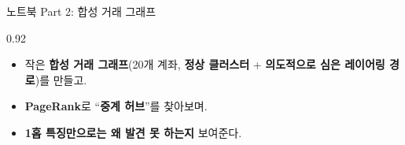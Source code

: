\begin{frame}{노트북 Part 2: 합성 거래 그래프}
\begin{center}\begin{varwidth}{0.92\textwidth}
  \begin{itemize}
    \item 작은 \textbf{합성 거래 그래프}(20개 계좌, \textbf{정상
      클러스터} + \textbf{의도적으로 심은 레이어링 경로})를
      만들고.
    \item \textbf{PageRank}로 ``\textbf{중계 허브}''를 찾아보며.
    \item \textbf{1홉 특징만으로는 왜 발견 못 하는지} 보여준다.
  \end{itemize}
\end{varwidth}\end{center}
\end{frame}
